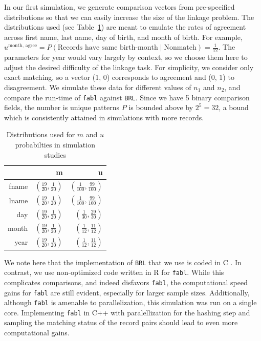 \documentclass[ba]{imsart}
\begin{document}
	In our first simulation, we generate comparison vectors from pre-specified distributions so that we can easily increase the size of the linkage problem. The distributions used (see Table~\ref{Tab:distributions}) are meant to emulate the rates of agreement across first name, last name, day of birth, and month of birth.  For example, $u^{\text{month, agree}} = P(\text{Records have same birth-month} \mid \text{Nonmatch}) = \frac{1}{12}$. The parameters for year would vary largely by context, so we choose them here to adjust the desired difficulty of the linkage task. For simplicity, we consider only exact matching, so a vector (1, 0) corresponds to agreement and (0, 1) to disagreement. We simulate these data for different values of \(n_1\) and \(n_2\), and compare the run-time of \texttt{fabl} against \texttt{BRL}. Since we have 5 binary comparison fields, the number is unique patterns \(P\) is bounded above by \(2^5 = 32\), a bound which is consistently attained in simulations with more records. 
	
	\begin{table}[t]
		\centering
		\begin{tabular}{rrr}
			\hline
			& m & u \\ 
			\hline
			fname & $\left(\frac{19}{20}, \frac{1}{20}\right)$ & $\left(\frac{1}{100}, \frac{99}{100}\right)$ \\ 
			lname & $\left(\frac{19}{20}, \frac{1}{20}\right)$ & $\left(\frac{1}{100}, \frac{99}{100}\right)$ \\ 
			day & $\left(\frac{19}{20}, \frac{1}{20}\right)$ & $\left(\frac{1}{30}, \frac{29}{30}\right)$ \\ 
			month & $\left(\frac{19}{20}, \frac{1}{20}\right)$ & $\left(\frac{1}{12}, \frac{11}{12}\right)$ \\ 
			year & $\left(\frac{19}{20}, \frac{1}{20}\right)$ & $\left(\frac{1}{12}, \frac{11}{12}\right)$ \\ 
			\hline
		\end{tabular}
		\caption{Distributions used for $m$ and $u$ probabilties in simulation studies}\label{Tab:distributions}
	\end{table}
	
	We note here that the implementation of \texttt{BRL} that we use is coded in C \citep{sadinle_bayesian_2017}.  In contrast, we use non-optimized code written in R for \texttt{fabl}.  While this complicates comparisons, and indeed disfavors \texttt{fabl}, the computational speed gains for \texttt{fabl} are still evident, especially for larger sample sizes.  Additionally, although \texttt{fabl} is amenable to parallelization, this simulation was run on a single core. Implementing \texttt{fabl} in C++ with paralellization for the hashing step and sampling the matching status of the record pairs should lead to even more computational gains.
	
\end{document}
